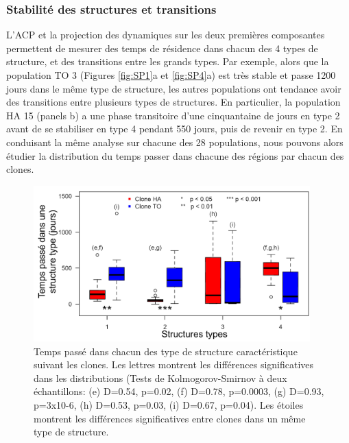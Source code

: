 \subsubsection{Stabilité des structures et transitions}

L'ACP et la projection des dynamiques sur les deux premières composantes
permettent de mesurer des temps de résidence dans chacun des 4 types de
structure, et des transitions entre les grands types. Par exemple, alors que la
population TO 3 (Figures \ref{fig:SP1}a et \ref{fig:SP4}a) est très stable et
passe 1200 jours dans le même type de structure, les autres populations ont
tendance avoir des transitions entre plusieurs types de structures. En
particulier, la population HA 15 (panels b) a une phase transitoire d'une
cinquantaine de jours en type 2 avant de se stabiliser en type 4 pendant 550
jours, puis de revenir en type 2. En conduisant la même analyse sur chacune des
28 populations, nous pouvons alors étudier la distribution du temps passer dans
chacune des régions par chacun des clones. 

\begin{figure}[!ht]
\begin{center}
\includegraphics[width=0.95\textwidth]{1_CorpsDeThese/Resumes/Fig/SP05}
\caption[Temps de
résidence dans les structures types]{Temps passé dans chacun des type de
structure caractéristique suivant les clones. Les lettres montrent les
différences significatives dans les distributions (Tests de Kolmogorov-Smirnov
à deux échantillons: (e) D=0.54, p=0.02, (f) D=0.78, p=0.0003, (g) D=0.93,
p=3x10-6, (h) D=0.53, p=0.03, (i) D=0.67, p=0.04). Les étoiles montrent les
différences significatives entre clones dans un même type de structure.}
\label{fig:SP5}
\end{center}
\end{figure}

